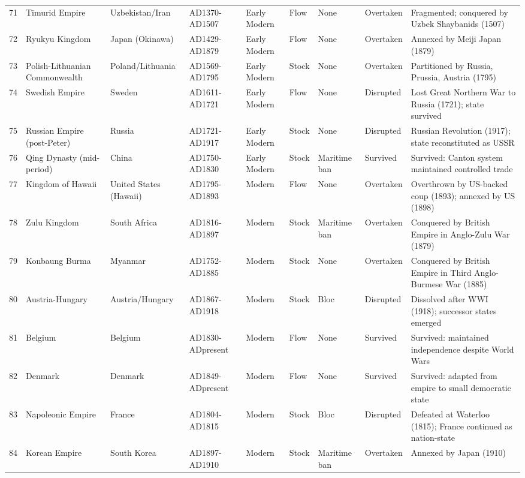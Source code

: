 \documentclass[11pt]{article}
\begin{document}
\begin{longtable}{rlllllllp{6cm}}
71 & Timurid Empire & Uzbekistan/Iran & AD1370-AD1507 & Early Modern & Flow & None & Overtaken & Fragmented; conquered by Uzbek Shaybanids (1507) \\
72 & Ryukyu Kingdom & Japan (Okinawa) & AD1429-AD1879 & Early Modern & Flow & None & Overtaken & Annexed by Meiji Japan (1879) \\
73 & Polish-Lithuanian Commonwealth & Poland/Lithuania & AD1569-AD1795 & Early Modern & Stock & None & Overtaken & Partitioned by Russia, Prussia, Austria (1795) \\
74 & Swedish Empire & Sweden & AD1611-AD1721 & Early Modern & Flow & None & Disrupted & Lost Great Northern War to Russia (1721); state survived \\
75 & Russian Empire (post-Peter) & Russia & AD1721-AD1917 & Early Modern & Stock & None & Disrupted & Russian Revolution (1917); state reconstituted as USSR \\
76 & Qing Dynasty (mid-period) & China & AD1750-AD1830 & Early Modern & Stock & Maritime ban & Survived & Survived: Canton system maintained controlled trade \\
77 & Kingdom of Hawaii & United States (Hawaii) & AD1795-AD1893 & Modern & Flow & None & Overtaken & Overthrown by US-backed coup (1893); annexed by US (1898) \\
78 & Zulu Kingdom & South Africa & AD1816-AD1897 & Modern & Stock & Maritime ban & Overtaken & Conquered by British Empire in Anglo-Zulu War (1879) \\
79 & Konbaung Burma & Myanmar & AD1752-AD1885 & Modern & Stock & None & Overtaken & Conquered by British Empire in Third Anglo-Burmese War (1885) \\
80 & Austria-Hungary & Austria/Hungary & AD1867-AD1918 & Modern & Stock & Bloc & Disrupted & Dissolved after WWI (1918); successor states emerged \\
81 & Belgium & Belgium & AD1830-ADpresent & Modern & Flow & None & Survived & Survived: maintained independence despite World Wars \\
82 & Denmark & Denmark & AD1849-ADpresent & Modern & Flow & None & Survived & Survived: adapted from empire to small democratic state \\
83 & Napoleonic Empire & France & AD1804-AD1815 & Modern & Stock & Bloc & Disrupted & Defeated at Waterloo (1815); France continued as nation-state \\
84 & Korean Empire & South Korea & AD1897-AD1910 & Modern & Stock & Maritime ban & Overtaken & Annexed by Japan (1910) \\

\end{longtable}
\end{document}
